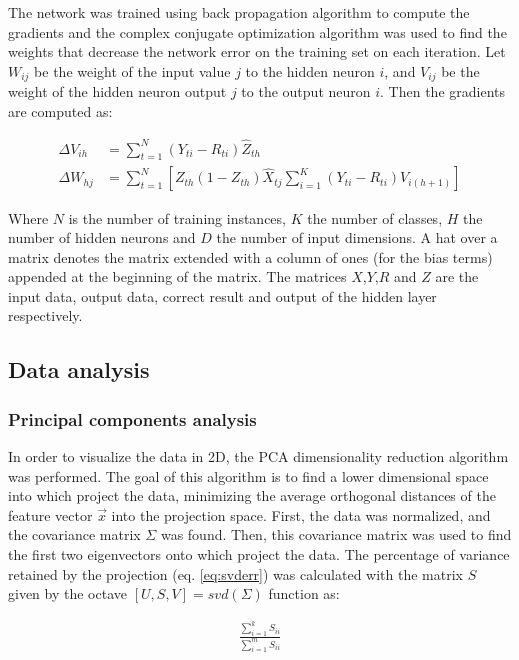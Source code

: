 \documentclass{IEEEtran}
\begin{document}
The network was trained using back propagation algorithm to compute the gradients and the complex conjugate
optimization algorithm was used to find the weights that decrease the network error on the training set on
each iteration. Let $W_{ij}$ be the weight of the input value $j$ to the hidden neuron $i$, and $V_{ij}$ be
the weight of the hidden neuron output $j$ to the output neuron $i$. Then the gradients are computed as:

\begin{align}
\Delta V_{ih} &= \sum_{t=1}^{N}{(Y_{ti} - R_{ti}) \hat{Z}_{th}} \label{eq:gradV} \\ 
\Delta W_{hj} &= \sum_{t=1}^{N}{ 
    \left[ Z_{th}(1 - Z_{th})\hat{X}_{tj} \sum_{i=1}^{K}{ (Y_{ti} - R_{ti})V_{i(h+1)} } \right]
}  \label{eq:gradW}
\end{align}

Where $N$ is the number of training instances, $K$ the number of classes, $H$ the number of hidden neurons 
and $D$ the number of input dimensions. A hat over a matrix denotes the matrix extended with a column of
ones (for the bias terms) appended at the beginning of the matrix. The matrices $X$,$Y$,$R$ and $Z$ are
the input data, output data, correct result and output of the hidden layer respectively.

\subsection{Data analysis}

\subsubsection{Principal components analysis}
In order to visualize the data in 2D, the PCA dimensionality reduction algorithm was performed.
The goal of this algorithm is to find a lower dimensional space into which project the data, minimizing
the average orthogonal distances of the feature vector $\vec{x}$ into the projection space. First, the data
was normalized, and the covariance matrix $\Sigma$ was found. Then, this covariance matrix was used to find the
first two eigenvectors onto which project the data. The percentage of variance retained by the projection 
(eq. \ref{eq:svderr}) was calculated with the matrix $S$ given by the octave $[U,S,V] = svd(\Sigma)$ function as:

\begin{align}
\frac{\sum_{i=1}^{k}S_{ii}}{\sum_{i=1}^{m}S_{ii}} \label{eq:svderr}
\end{align}
\end{document}
